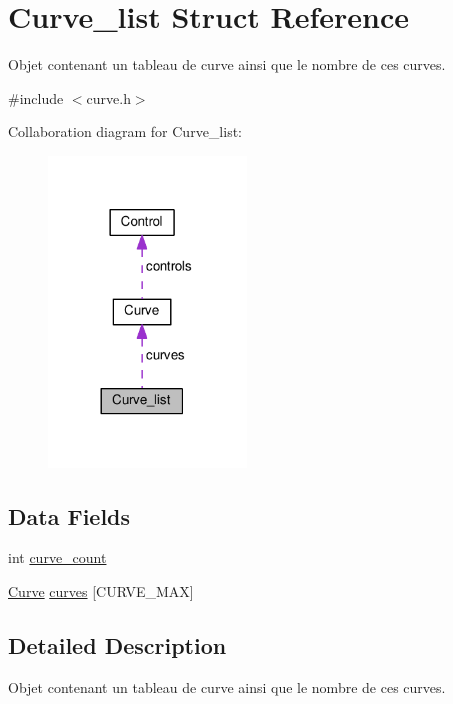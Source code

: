 \hypertarget{struct_curve__list}{}\section{Curve\+\_\+list Struct Reference}
\label{struct_curve__list}


Objet contenant un tableau de curve ainsi que le nombre de ces curves.  




{\ttfamily \#include $<$curve.\+h$>$}



Collaboration diagram for Curve\+\_\+list\+:
\nopagebreak
\begin{figure}[H]
\begin{center}
\leavevmode
\includegraphics[width=149pt]{struct_curve__list__coll__graph}
\end{center}
\end{figure}
\subsection*{Data Fields}
\begin{DoxyCompactItemize}
\item 
int \hyperlink{struct_curve__list_a97c088ae642b601e713d2001c718864d}{curve\+\_\+count}
\item 
\hyperlink{struct_curve}{Curve} \hyperlink{struct_curve__list_a55c0ff2f9889340ccae2f1b414a2f482}{curves} \mbox{[}C\+U\+R\+V\+E\+\_\+\+M\+AX\mbox{]}
\end{DoxyCompactItemize}


\subsection{Detailed Description}
Objet contenant un tableau de curve ainsi que le nombre de ces curves. 

